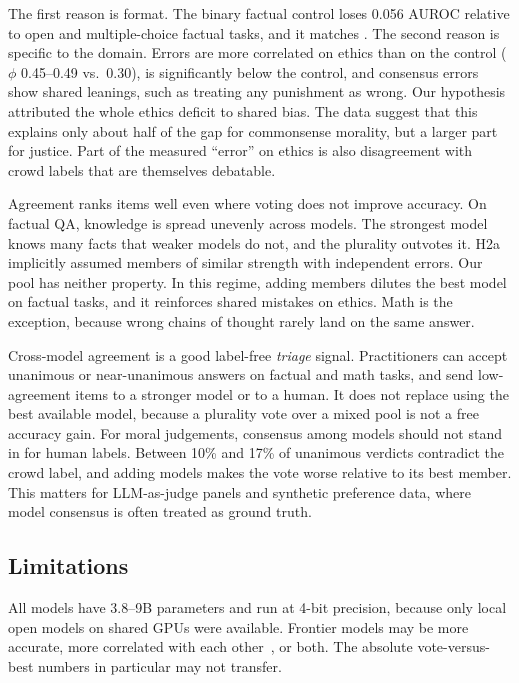 The first reason is format.
The binary factual control loses 0.056 AUROC relative to open and multiple-choice factual tasks, and it matches \ethcs.
The second reason is specific to the domain.
Errors are more correlated on ethics than on the control ($\phi$ 0.45--0.49 vs.\ 0.30), \ethjus is significantly below the control, and consensus errors show shared leanings, such as treating any punishment as wrong.
Our hypothesis attributed the whole ethics deficit to shared bias.
The data suggest that this explains only about half of the gap for commonsense morality, but a larger part for justice.
Part of the measured ``error'' on ethics is also disagreement with crowd labels that are themselves debatable.

Agreement ranks items well even where voting does not improve accuracy.
On factual QA, knowledge is spread unevenly across models.
The strongest model knows many facts that weaker models do not, and the plurality outvotes it.
H2a implicitly assumed members of similar strength with independent errors.
Our pool has neither property.
In this regime, adding members dilutes the best model on factual tasks, and it reinforces shared mistakes on ethics.
Math is the exception, because wrong chains of thought rarely land on the same answer.

Cross-model agreement is a good label-free {\em triage} signal.
Practitioners can accept unanimous or near-unanimous answers on factual and math tasks, and send low-agreement items to a stronger model or to a human.
It does not replace using the best available model, because a plurality vote over a mixed pool is not a free accuracy gain.
For moral judgements, consensus among models should not stand in for human labels.
Between 10\% and 17\% of unanimous \ethics verdicts contradict the crowd label, and adding models makes the vote worse relative to its best member.
This matters for LLM-as-judge panels and synthetic preference data, where model consensus is often treated as ground truth.

\subsection{Limitations}
\label{sec:limitations}

All models have 3.8--9B parameters and run at 4-bit precision, because only local open models on shared GPUs were available.
Frontier models may be more accurate, more correlated with each other~\citep{goel2025greatmodels}, or both.
The absolute vote-versus-best numbers in particular may not transfer.

